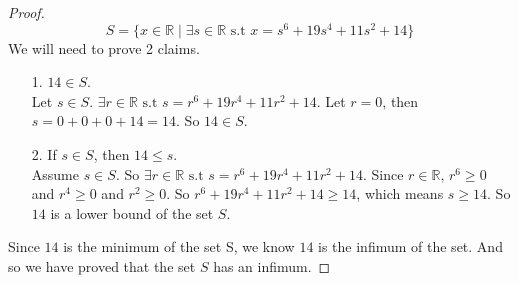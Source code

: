 \documentclass{article}
\theoremstyle{claim}
\theoremstyle{definition}
\begin{document}
\begin{enumerate}
\begin{proof}
\begin{equation*}
            S = \{ x \in \mathbb{R} \mid \exists s \in \mathbb{R} \text{ s.t } x = s^6 + 19s^4 + 11s^2 + 14 \}
        \end{equation*}
        We will need to prove 2 claims.
        \begin{enumerate}
            \item[1.] $14 \in S$.\\
                Let $s \in S$. $\exists r \in \mathbb{R} \text{ s.t } s = r^6 + 19r^4 + 11r^2 + 14$. Let $r = 0$, then $s = 0 + 0 + 0 + 14 = 14$. So $14 \in S$.
            \item[2.] If $s \in S$, then $14 \le s$.\\
                Assume $s \in S$. So $\exists r \in \mathbb{R} \text{ s.t } s = r^6 + 19r^4 + 11r^2 + 14$. Since $r \in \mathbb{R}$, $r^6 \ge 0$ and $r^4 \ge 0$ and $r^2 \ge 0$. So $r^6 + 19r^4 + 11r^2 + 14 \ge 14$, which means $s \ge 14$. So $14$ is a lower bound of the set $S$.
        \end{enumerate}
        Since $14$ is the minimum of the set S, we know $14$ is the infimum of the set. And so we have proved that the set $S$ has an infimum.
    \end{proof}
\end{enumerate}
\end{document}
